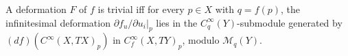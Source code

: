 A deformation $F$ of $f$ is trivial iff for every $p \in X$ with $q = f(p)$, the infinitesimal deformation $\partial f_u/\partial u_i|_p$ lies in the $C_q^\infty(Y)$-submodule generated by $(df)(C^\infty(X, TX)_p)$ in $C_f^\infty(X, TY)_p$, modulo $\mathcal{M}_q(Y)$.
